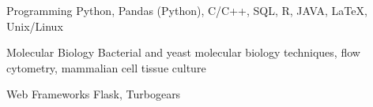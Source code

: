

\begin{cvskills}

  \cvskill
  {Programming} %
  {Python, Pandas (Python), C/C++, SQL, R, JAVA, LaTeX, Unix/Linux} %


  \cvskill
  {Molecular Biology} %
  {Bacterial and yeast molecular biology techniques, flow cytometry, mammalian cell tissue culture} %

  \cvskill
  {Web Frameworks} %
  {Flask, Turbogears} %

\end{cvskills}
